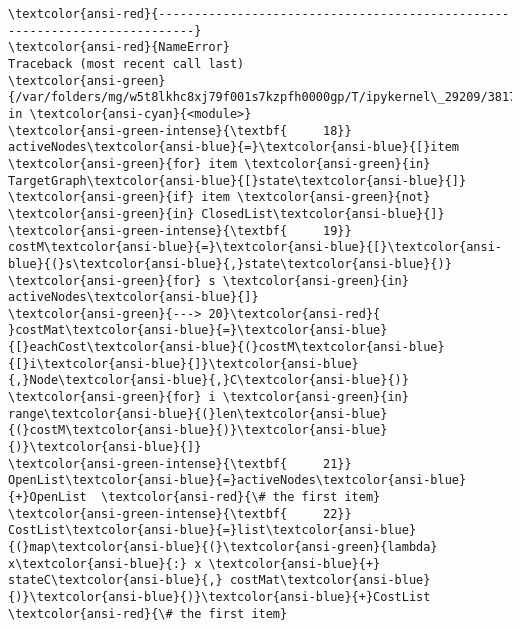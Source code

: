 \documentclass[11pt]{article}
\begin{document}
    \begin{Verbatim}[commandchars=\\\{\}, frame=single, framerule=2mm, rulecolor=\color{outerrorbackground}]
\textcolor{ansi-red}{---------------------------------------------------------------------------}
\textcolor{ansi-red}{NameError}                                 Traceback (most recent call last)
\textcolor{ansi-green}{/var/folders/mg/w5t8lkhc8xj79f001s7kzpfh0000gp/T/ipykernel\_29209/3817949483.py} in \textcolor{ansi-cyan}{<module>}
\textcolor{ansi-green-intense}{\textbf{     18}}     activeNodes\textcolor{ansi-blue}{=}\textcolor{ansi-blue}{[}item \textcolor{ansi-green}{for} item \textcolor{ansi-green}{in} TargetGraph\textcolor{ansi-blue}{[}state\textcolor{ansi-blue}{]} \textcolor{ansi-green}{if} item \textcolor{ansi-green}{not} \textcolor{ansi-green}{in} ClosedList\textcolor{ansi-blue}{]}
\textcolor{ansi-green-intense}{\textbf{     19}}     costM\textcolor{ansi-blue}{=}\textcolor{ansi-blue}{[}\textcolor{ansi-blue}{(}s\textcolor{ansi-blue}{,}state\textcolor{ansi-blue}{)} \textcolor{ansi-green}{for} s \textcolor{ansi-green}{in} activeNodes\textcolor{ansi-blue}{]}
\textcolor{ansi-green}{---> 20}\textcolor{ansi-red}{     }costMat\textcolor{ansi-blue}{=}\textcolor{ansi-blue}{[}eachCost\textcolor{ansi-blue}{(}costM\textcolor{ansi-blue}{[}i\textcolor{ansi-blue}{]}\textcolor{ansi-blue}{,}Node\textcolor{ansi-blue}{,}C\textcolor{ansi-blue}{)} \textcolor{ansi-green}{for} i \textcolor{ansi-green}{in} range\textcolor{ansi-blue}{(}len\textcolor{ansi-blue}{(}costM\textcolor{ansi-blue}{)}\textcolor{ansi-blue}{)}\textcolor{ansi-blue}{]}
\textcolor{ansi-green-intense}{\textbf{     21}}     OpenList\textcolor{ansi-blue}{=}activeNodes\textcolor{ansi-blue}{+}OpenList  \textcolor{ansi-red}{\# the first item}
\textcolor{ansi-green-intense}{\textbf{     22}}     CostList\textcolor{ansi-blue}{=}list\textcolor{ansi-blue}{(}map\textcolor{ansi-blue}{(}\textcolor{ansi-green}{lambda} x\textcolor{ansi-blue}{:} x \textcolor{ansi-blue}{+} stateC\textcolor{ansi-blue}{,} costMat\textcolor{ansi-blue}{)}\textcolor{ansi-blue}{)}\textcolor{ansi-blue}{+}CostList  \textcolor{ansi-red}{\# the first item}


\end{Verbatim}
\end{document}
